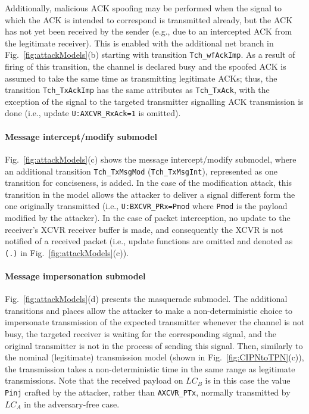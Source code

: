 Additionally, malicious ACK spoofing may be performed when the signal to which the ACK is intended to correspond is transmitted already, but the ACK has not yet been received by the sender (e.g., due to an intercepted ACK from the legitimate receiver). This is enabled with the additional net branch in Fig.~\ref{fig:attackModels}(b) starting with transition \verb!Tch_wfAckImp!. As a result of firing of this transition, the channel is declared busy and the spoofed ACK is assumed to take the same time as transmitting legitimate ACKs; thus,  the transition \verb!Tch_TxAckImp! has the same attributes as \verb!Tch_TxAck!, with the exception of the signal to the targeted transmitter signalling ACK transmission is done (i.e., update \verb!U:AXCVR_RxAck=1! is omitted).

\paragraph{Message intercept/modify submodel} Fig.~\ref{fig:attackModels}(c) shows the message intercept/modify submodel, where an additional transition \verb!Tch_TxMsgMod! (\verb!Tch_TxMsgInt!), {represented as one transition for conciseness}, is added. In the case of the modification attack, this transition in the model allows the attacker to deliver a signal different form the one originally transmitted (i.e., \verb!U:BXCVR_PRx=Pmod! where \verb!Pmod! is the payload modified by the attacker). In the case of packet interception, no update to the receiver's XCVR receiver buffer is made, and consequently the XCVR is not notified of a received packet (i.e., update functions are omitted and denoted as \verb!(.)! in Fig.~\ref{fig:attackModels}(c)).


\paragraph{Message impersonation submodel} Fig.~\ref{fig:attackModels}(d) presents the masquerade submodel. The additional transitions and places allow the attacker to make a non-deterministic choice to impersonate transmission of the expected transmitter whenever the channel is not busy, the targeted receiver is waiting for the corresponding signal, and the original transmitter is not in the process of sending this signal. Then, similarly to the nominal (legitimate) transmission model (shown in Fig.~\ref{fig:CIPNtoTPN}(c)), the transmission takes a non-deterministic time in the same range as legitimate transmissions. Note that the received payload on $LC_B$ is in this case the value \verb!Pinj! crafted by the attacker, rather than \verb!AXCVR_PTx!, normally transmitted by $LC_A$ in the adversary-free case.


